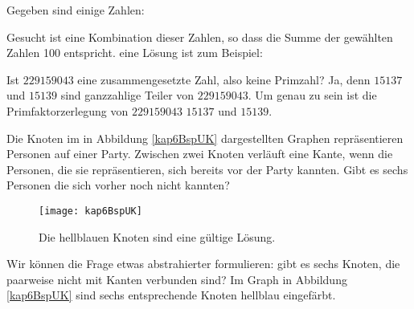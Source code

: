 \begin{Bsp}
  \hspace{\parindent}Gegeben sind einige Zahlen:
  \begin{center}
  \end{center}
  
  Gesucht ist eine Kombination dieser Zahlen, so dass die Summe der gewählten Zahlen 100 entspricht. eine Lösung ist zum Beispiel:
  \begin{center}
    \end{center}
\end{Bsp}

\begin{Bsp}
  \hspace{\parindent}Ist $229159043$ eine zusammengesetzte Zahl, also keine Primzahl? Ja, denn $15137$ und $15139$ sind ganzzahlige Teiler von $229159043$. Um genau zu sein ist die Primfaktorzerlegung von $229159043$ $15137$ und $15139$.
\end{Bsp}

\begin{Bsp}
  \hspace{\parindent}Die Knoten im in Abbildung \vref{kap6BspUK} dargestellten Graphen repräsentieren Personen auf einer Party. Zwischen zwei Knoten verläuft eine Kante, wenn die Personen, die sie repräsentieren, sich bereits vor der Party kannten. Gibt es sechs Personen die sich vorher noch nicht kannten?
  
  \begin{figure}[htb]
    \centering
    \texttt{[image: kap6BspUK]}
    \caption{Die hellblauen Knoten sind eine gültige Lösung.}
    \label{kap6BspUK}
  \end{figure}

  Wir können die Frage etwas abstrahierter formulieren: gibt es sechs Knoten, die paarweise nicht mit Kanten verbunden sind? Im Graph in Abbildung \vref{kap6BspUK} sind sechs entsprechende Knoten hellblau eingefärbt.
\end{Bsp}


